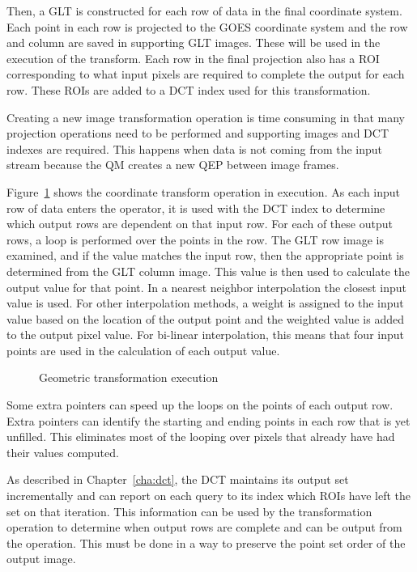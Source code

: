 \documentclass{ucdthesis}       %
\begin{document}
Then, a \ac{GLT} is constructed for each row of data in the final
coordinate system.  Each point in each row is projected to the
\ac{GOES} coordinate system and the row and column are saved in
supporting \ac{GLT} images. These will be used in the execution of the
transform.  Each row in the final projection also has a \ac{ROI}
corresponding to what input pixels are required to complete the output
for each row.  These \acp{ROI} are added to a \ac{DCT} index used for
this transformation.

Creating a new image transformation operation is time consuming in
that many projection operations need to be performed and supporting
images and \ac{DCT} indexes are required.  This happens when data is
not coming from the input stream because the \ac{QM} creates a new
\ac{QEP} between image frames.


Figure~\ref{fig:geometric-transform} shows the coordinate transform
operation in execution.  As each input row of data enters the
operator, it is used with the \ac{DCT} index to determine which output
rows are dependent on that input row.  For each of these output rows,
a loop is performed over the points in the row.  The \ac{GLT} row
image is examined, and if the value matches the input row, then the
appropriate point is determined from the \ac{GLT} column image.  This
value is then used to calculate the output value for that point.  In a
nearest neighbor interpolation the closest input value is used.  For
other interpolation methods, a weight is assigned to the input value
based on the location of the output point and the weighted value is
added to the output pixel value.  For bi-linear interpolation, this
means that four input points are used in the calculation of each
output value.

\begin{figure}[htb]
  \centering
  
  \caption{Geometric transformation execution}
  \label{fig:geometric-transform}
\end{figure}

Some extra pointers can speed up the loops on the points of each
output row.  Extra pointers can identify the starting and ending
points in each row that is yet unfilled.  This eliminates most of the
looping over pixels that already have had their values computed.

As described in Chapter~\ref{cha:dct}, the \ac{DCT} maintains its
output set incrementally and can report on each query to its index
which \acp{ROI} have left the set on that iteration.  This information
can be used by the transformation operation to determine when output
rows are complete and can be output from the operation.  This must be
done in a way to preserve the point set order of the output image.
\end{document}
